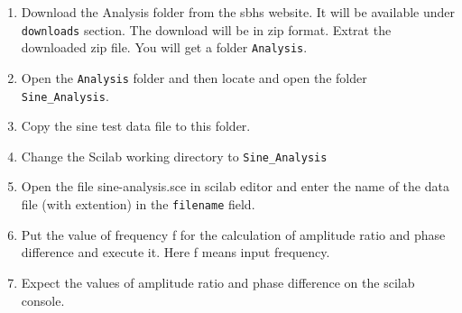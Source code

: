 \begin{enumerate}
\item Download the Analysis folder from the sbhs website. It will be available under {\tt downloads} section. The download will be in zip format. Extrat the downloaded zip file. You will get a folder {\tt Analysis}. 
\item Open the {\tt Analysis} folder and then locate and open the folder {\tt Sine\_Analysis}.
 \item Copy the sine test data file to this folder.
 \item Change the Scilab working directory to  {\tt Sine\_Analysis}
 \item Open the file {\ttfamily sine-analysis.sce} in scilab editor and enter the name of the data file (with extention) in the {\tt filename} field.
\item Put the value of frequency {\ttfamily f} for the calculation of amplitude ratio and phase difference and execute it. Here {\ttfamily f} means input frequency.
\item Expect the values of amplitude ratio and phase difference on the scilab console.
\end{enumerate}

